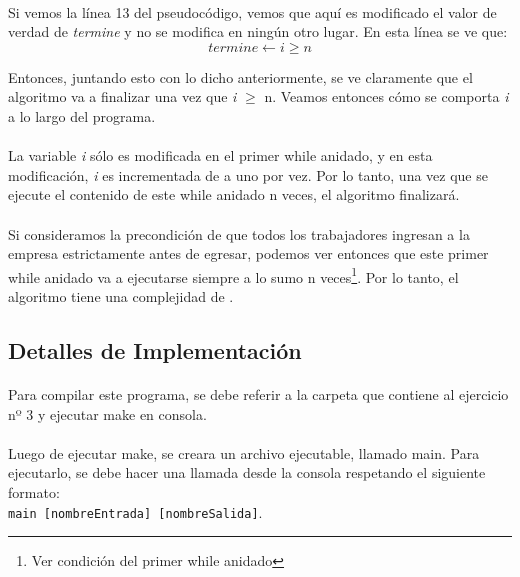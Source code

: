 \paragraph{}
Si vemos la línea 13 del pseudocódigo, vemos que aquí es modificado el valor de verdad de \textit{termine} y no se modifica en ningún otro lugar. En esta línea se ve que:
\begin{equation}
termine \leftarrow i \geq n
\end{equation}

Entonces, juntando esto con lo dicho anteriormente, se ve claramente que el algoritmo va a finalizar una vez que \textit{i} \ensuremath{\geq} n. Veamos entonces cómo se comporta \textit{i} a lo largo del programa.

\paragraph{}
La variable \textit{i} sólo es modificada en el primer while anidado, y en esta modificación, \textit{i} es incrementada de a uno por vez. Por lo tanto, una vez que se ejecute el contenido de este while anidado n veces, el algoritmo finalizará.

\paragraph{}
Si consideramos la precondición de que todos los trabajadores ingresan a la empresa estrictamente antes de egresar, podemos ver entonces que este primer while anidado va a ejecutarse siempre a lo sumo n veces\footnote{Ver condición del primer while anidado}. Por lo tanto, el algoritmo tiene una complejidad de .



\subsection{Detalles de Implementación}

\paragraph{}
Para compilar este programa, se debe referir a la carpeta que contiene al ejercicio nº 3 y ejecutar make en consola.

\paragraph{}
Luego de ejecutar make, se creara un archivo ejecutable, llamado main. Para ejecutarlo, se debe hacer una llamada desde la consola respetando el siguiente formato:\\
\texttt{main [nombreEntrada] [nombreSalida]}.

